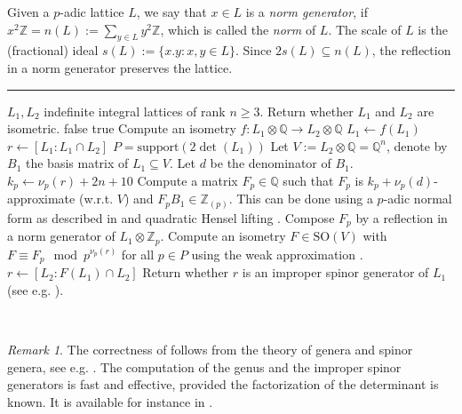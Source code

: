 \documentclass[11pt,letterpaper]{amsart}
\newcommand{\QQ}{\mathbb{Q}}
\newcommand{\ZZ}{\mathbb{Z}}
\theoremstyle{definition}
\theoremstyle{remark}
\newtheorem{remark}[theorem]{Remark}
\begin{document}
Given a $p$-adic lattice $L$, we say that $x \in L$ is a \emph{norm generator}, if $x^2\ZZ = n(L):=\sum_{y \in L} y^2 \ZZ$, which is called the \emph{norm} of $L$. The scale of $L$ is the (fractional) ideal $s(L):=\{x.y : x ,y \in L\}$. Since 
$2s(L)\subseteq n(L)$, the reflection in a norm generator preserves the lattice. 

\begingroup
{}\label{alg:isometry-test}
\endgroup
\hrule
\begin{algorithmic}[1]
\REQUIRE $L_1,L_2$ indefinite integral lattices of rank $n \geq 3$.
\ENSURE Return whether $L_1$ and $L_2$ are isometric.
\RETURN false 
\ENDIF
{}
\RETURN true 
\ENDIF 
\STATE Compute an isometry $f \colon L_1\otimes \QQ \to L_2\otimes \QQ$
\STATE $L_1 \gets f(L_1)$
\STATE $r \gets [L_1 : L_1 \cap L_2]$
\STATE $P = \text{support}(2 \det(L_1))$
\STATE Let $V:= L_2 \otimes \QQ = \QQ^n$, denote by $B_1$ the basis matrix of $L_1 \subseteq V$.
\STATE Let $d$ be the denominator of $B_1$.
\STATE $k_p \gets  \nu_p(r) + 2n + 10$
 \label{alg:isometry-test-line-redo}
\STATE Compute a matrix $F_p \in \QQ$ such that $F_p$ is $k_p+\nu_p(d)$-approximate (w.r.t. $V$) and $F_p B_1 \in \ZZ_{(p)}$. This can be done using a $p$-adic normal form as described in \cite{miranda.morrison.embeddings} and quadratic Hensel lifting \cite[Algorithm 3]{brandhorst.veniani.hensel-lifting}. 
\STATE Compose $F_p$ by a reflection in a norm generator of $L_1 \otimes \ZZ_p$.
\ENDIF 
\ENDFOR
\STATE Compute an isometry $F \in \mathrm{SO}(V)$ with $F\equiv F_p \mod p^{\nu_p(r)}$ for all $p \in P$ using the weak approximation . 
\STATE $r \gets [L_2 : F(L_1) \cap L_2]$
\RETURN Return whether $r$ is an improper spinor generator of $L_1$ (see e.g. \cite[Chapter 15 \S 9]{conway.sloane.lattices}).
\end{algorithmic}\hrulefill\\

\begin{remark}
The correctness of  follows from the theory of genera and spinor genera, see e.g. \cite{conway.sloane.lattices,cassels.quadratic,meara.quadratic}. The computation of the genus and the improper spinor generators is fast and effective, provided the factorization of the determinant is known. It is available for instance in \cite{OSCAR}.
\end{remark}


\printbibliography
\end{document}
